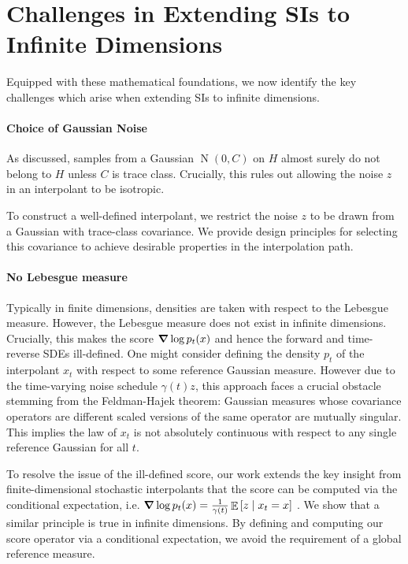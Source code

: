 

\section{Challenges in Extending SIs to Infinite Dimensions}
Equipped with these mathematical foundations, we now identify the key challenges which arise when extending SIs to infinite dimensions.

\paragraph{Choice of Gaussian Noise} As discussed, samples from a Gaussian \(\operatorname{N}(0, C)\) on \(H\) almost surely do not belong to \(H\) unless \(C\) is trace class. Crucially, this rules out allowing the noise \(z\) in an interpolant to be isotropic.

To construct a well-defined interpolant, we restrict the noise \(z\) to be drawn from a Gaussian with trace-class covariance. We provide design principles for selecting this covariance to achieve desirable properties in the interpolation path. %

\paragraph{No Lebesgue measure} Typically in finite dimensions, densities are taken with respect to the Lebesgue measure. However, the Lebesgue measure does not exist in infinite dimensions. Crucially, this makes the score \(\grad \log p_{t}(x)\) and hence the forward and time-reverse SDEs ill-defined. One might consider defining the density \(p_{t}\) of the interpolant \(x_{t}\) with respect to some reference Gaussian measure. However due to the time-varying noise schedule \(\gamma(t)z\), this approach faces a crucial obstacle stemming from the Feldman-Hajek theorem: Gaussian measures whose covariance operators are different scaled versions of the same operator are mutually singular. This implies the law of \(x_{t}\) is not absolutely continuous with respect to any single reference Gaussian for all \(t\). %

To resolve the issue of the ill-defined score, our work extends the key insight from finite-dimensional stochastic interpolants that the score can be computed via the conditional expectation, i.e. \(\grad \log p_{t}(x) =  \frac{1}{\gamma(t)} \mathop{\mathbb{E}}\qty[z \mid x_{t} = x]\) \citep[][Theorem 2.8]{albergo2023stochasticinterpolantsunifyingframework}. We show that a similar principle is true in infinite dimensions. By defining and computing our score operator via a conditional expectation, we avoid the requirement of a global reference measure.

